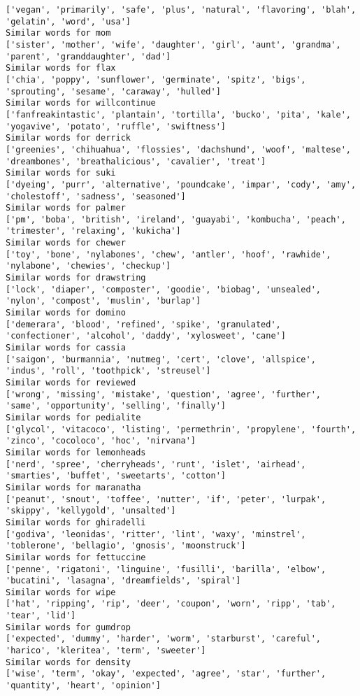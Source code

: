 \documentclass[11pt]{article}
\begin{document}
\begin{Verbatim}[commandchars=\\\{\}]
['vegan', 'primarily', 'safe', 'plus', 'natural', 'flavoring', 'blah', 'gelatin', 'word', 'usa']
Similar words for mom
['sister', 'mother', 'wife', 'daughter', 'girl', 'aunt', 'grandma', 'parent', 'granddaughter', 'dad']
Similar words for flax
['chia', 'poppy', 'sunflower', 'germinate', 'spitz', 'bigs', 'sprouting', 'sesame', 'caraway', 'hulled']
Similar words for willcontinue
['fanfreakintastic', 'plantain', 'tortilla', 'bucko', 'pita', 'kale', 'yogavive', 'potato', 'ruffle', 'swiftness']
Similar words for derrick
['greenies', 'chihuahua', 'flossies', 'dachshund', 'woof', 'maltese', 'dreambones', 'breathalicious', 'cavalier', 'treat']
Similar words for suki
['dyeing', 'purr', 'alternative', 'poundcake', 'impar', 'cody', 'amy', 'cholestoff', 'sadness', 'seasoned']
Similar words for palmer
['pm', 'boba', 'british', 'ireland', 'guayabi', 'kombucha', 'peach', 'trimester', 'relaxing', 'kukicha']
Similar words for chewer
['toy', 'bone', 'nylabones', 'chew', 'antler', 'hoof', 'rawhide', 'nylabone', 'chewies', 'checkup']
Similar words for drawstring
['lock', 'diaper', 'composter', 'goodie', 'biobag', 'unsealed', 'nylon', 'compost', 'muslin', 'burlap']
Similar words for domino
['demerara', 'blood', 'refined', 'spike', 'granulated', 'confectioner', 'alcohol', 'daddy', 'xylosweet', 'cane']
Similar words for cassia
['saigon', 'burmannia', 'nutmeg', 'cert', 'clove', 'allspice', 'indus', 'roll', 'toothpick', 'streusel']
Similar words for reviewed
['wrong', 'missing', 'mistake', 'question', 'agree', 'further', 'same', 'opportunity', 'selling', 'finally']
Similar words for pedialite
['glycol', 'vitacoco', 'listing', 'permethrin', 'propylene', 'fourth', 'zinco', 'cocoloco', 'hoc', 'nirvana']
Similar words for lemonheads
['nerd', 'spree', 'cherryheads', 'runt', 'islet', 'airhead', 'smarties', 'buffet', 'sweetarts', 'cotton']
Similar words for maranatha
['peanut', 'snout', 'toffee', 'nutter', 'if', 'peter', 'lurpak', 'skippy', 'kellygold', 'unsalted']
Similar words for ghiradelli
['godiva', 'leonidas', 'ritter', 'lint', 'waxy', 'minstrel', 'toblerone', 'bellagio', 'gnosis', 'moonstruck']
Similar words for fettuccine
['penne', 'rigatoni', 'linguine', 'fusilli', 'barilla', 'elbow', 'bucatini', 'lasagna', 'dreamfields', 'spiral']
Similar words for wipe
['hat', 'ripping', 'rip', 'deer', 'coupon', 'worn', 'ripp', 'tab', 'tear', 'lid']
Similar words for gumdrop
['expected', 'dummy', 'harder', 'worm', 'starburst', 'careful', 'harico', 'kleritea', 'term', 'sweeter']
Similar words for density
['wise', 'term', 'okay', 'expected', 'agree', 'star', 'further', 'quantity', 'heart', 'opinion']

\end{Verbatim}
\end{document}
